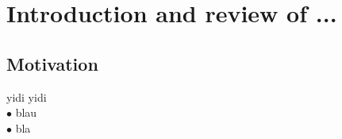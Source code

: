 
\section{Introduction and review of ...}
\subsection{Motivation}
yidi yidi\\
$\bullet$ blau\\
$\bullet$ bla
